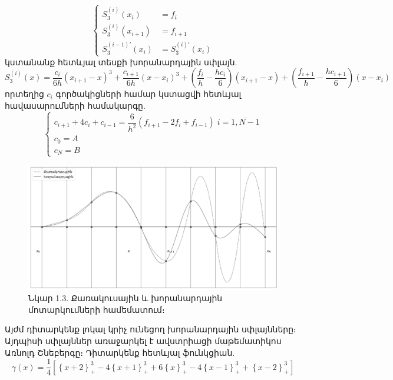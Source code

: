 \documentclass[fleqn, bachelor,subf,12pt,notitlepage]{article}
\begin{document}
\begin{equation}
\begin{cases}
				S_{3}^{(i)}(x_{i}) &=f_{i}\\
				S_{3}^{(i)}(x_{i+1}) &= f_{i+1}\\
				S_{3}^{(i-1)'}(x_{i}) &= S_{3}^{(i)'}(x_{i})

\end{cases}
\end{equation}
կստանանք հետևյալ տեսքի խորանարդային սփլայն.
\begin{equation}
	S_{3}^{(i)}(x) = \dfrac{c_{i}}{6h}\left(x_{i+1}-x\right)^{3}+\dfrac{c_{i+1}}{6h}\left(x-x_{i}\right)^{3}+\left(\dfrac{f_{i}}{h}-\dfrac{hc_{i}}{6}\right)\left(x_{i+1}-x\right)+\left(\dfrac{f_{i+1}}{h}-\dfrac{hc_{i+1}}{6}\right)\left(x-x_{i}\right)
\end{equation}
որտեղից $c_{i}$ գործակիցների համար կստացվի հետևյալ հավասարումների համակարգը.
\begin{equation}
\begin{cases}
c_{i+1}+4c_{i}+c_{i-1} = \dfrac{6}{h^2}\left(f_{i+1}-2f_{i}+f_{i-1}\right) \; i=\overline{1, N-1}\\
c_{0}=A\\
c_{N}=B
\end{cases}
\end{equation}
\begin{figure}[h!]
\centering
\includegraphics[width=1.0\textwidth]{images/quadratic_and_cubic_interploation}
\captionsetup{labelformat=empty}
\caption{Նկար 1.3. Քառակուսային և խորանարդային մոտարկումների համեմատում։}
\end{figure}
\newpage
Այժմ դիտարկենք լոկալ կրիչ ունեցող խորանարդային սփլայնները։ Այդպիսի սփլայններ առաջարկել է ավստրիացի մաթեմատիկոս Առնոլդ Շնեբերգը։
Դիտարկենք հետևյալ ֆունկցիան.
\begin{equation}
				\gamma(x)=\dfrac{1}{4}\left[\left\{x+2\right\}^{3}_{+} - 4\left\{x+1\right\}^{3}_{+}+ 6\left\{x\right\}^{3}_{+} -4\left\{x-1\right\}^{3}_{+} + \left\{x-2\right\}^{3}_{+}\right]
\end{equation}
\end{document}
